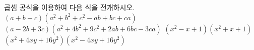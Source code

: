 곱셈 공식을 이용하여 다음 식을 전개하시오.
 $(a+b-c)(a^2+b^2+c^2-ab+bc+ca)$
 $(a-2b+3c)(a^2+4b^2+9c^2+2ab+6bc-3ca)$
 $(x^2-x+1)(x^2+x+1)$
 $(x^2+4xy+16y^2)(x^2-4xy+16y^2)$
